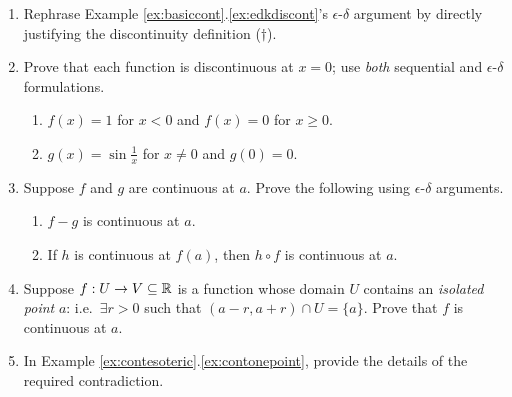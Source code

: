 \begin{exercises}{}{}
\begin{enumerate}
	  
	  \item Rephrase Example \ref*{ex:basiccont}.\ref{ex:edkdiscont}'s $\epsilon$-$\delta$ argument by directly justifying the discontinuity definition ($\dag$).
	  	  

		\item Prove that each function is discontinuous at $x=0$; use \emph{both} sequential and $\epsilon$-$\delta$ formulations.
		\begin{enumerate}
	  	\item $f(x)=1$ for $x<0$ and $f(x)=0$ for $x\ge 0$.
	  	\item $g(x)=\sin\frac 1x$ for $x\neq 0$ and $g(0)=0$.
		\end{enumerate}
	
	
		\item Suppose $f$ and $g$ are continuous at $a$. Prove the following using $\epsilon$-$\delta$ arguments.
		\begin{enumerate}
	  	\item $f-g$ is continuous at $a$.
	  	\item If $h$ is continuous at $f(a)$, then $h\circ f$ is continuous at $a$.
		\end{enumerate}
		
	  
	
		
	  \item Suppose $f:U\to V\subseteq\mathbb{R}$ is a function whose domain $U$ contains an \emph{isolated point} $a$: i.e.\ $\exists r>0$ such that $(a-r,a+r)\cap U=\{a\}$. Prove that $f$ is continuous at $a$.
	  
	
		\item In Example \ref*{ex:contesoteric}.\ref{ex:contonepoint}, provide the details of the required contradiction.
	

\end{enumerate}
\end{exercises}
